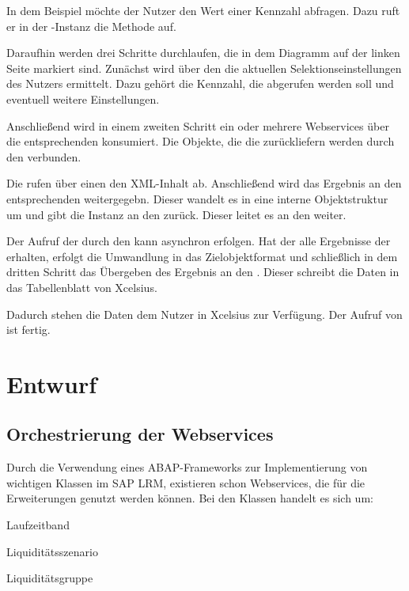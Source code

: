 \begin{onehalfspacing}

In dem Beispiel möchte der Nutzer den Wert einer Kennzahl abfragen. Dazu ruft er in der -Instanz die Methode  auf.

Daraufhin werden drei Schritte durchlaufen, die in dem Diagramm auf der linken Seite markiert sind. Zunächst wird über den  die aktuellen Selektionseinstellungen des Nutzers ermittelt. Dazu gehört die Kennzahl, die abgerufen werden soll und eventuell weitere Einstellungen.

Anschließend wird in einem zweiten Schritt ein oder mehrere Webservices über die entsprechenden  konsumiert. Die Objekte, die die  zurückliefern werden durch den  verbunden.

Die  rufen über einen  den \gls{XML}-Inhalt ab. Anschließend wird das Ergebnis an den entsprechenden  weitergegebn. Dieser wandelt es in eine interne Objektstruktur um und gibt die Instanz an den  zurück. Dieser leitet es an den  weiter.

Der Aufruf der  durch den  kann asynchron erfolgen. Hat der  alle Ergebnisse der  erhalten, erfolgt die Umwandlung in das Zielobjektformat und schließlich in dem dritten Schritt das Übergeben des Ergebnis an den . Dieser schreibt die Daten in das Tabellenblatt von Xcelsius.

Dadurch stehen die Daten dem Nutzer in Xcelsius zur Verfügung. Der Aufruf von  ist fertig.

\section{Entwurf}

\subsection{Orchestrierung der Webservices}
Durch die Verwendung eines ABAP-Frameworks zur Implementierung von wichtigen Klassen im SAP LRM, existieren schon Webservices, die für die Erweiterungen genutzt werden können. Bei den Klassen handelt es sich um:

\begin{seList}
\item Laufzeitband
\item Liquiditätsszenario
\item Liquiditätsgruppe
\end{seList}


\end{onehalfspacing}
